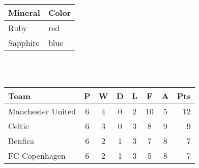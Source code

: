 \documentclass[12pt,a4paper]{article}
\begin{document}
  ~\\~
  
  \begin{tabular}{l|l}
    \hline
    Mineral & Color \\[1cm]
    \hline
    Ruby & red \\
    Sapphire & blue \\
    \hline
  \end{tabular}
  
  ~\\~
  
  \begin{tabular}{l*{6}{c}r}
    Team              & P & W & D & L & F  & A & Pts \\
    \hline
    Manchester United & 6 & 4 & 0 & 2 & 10 & 5 & 12  \\
    Celtic            & 6 & 3 & 0 & 3 &  8 & 9 &  9  \\
    Benfica           & 6 & 2 & 1 & 3 &  7 & 8 &  7  \\
    FC Copenhagen     & 6 & 2 & 1 & 3 &  5 & 8 &  7  \\
  \end{tabular}
    
\end{document}
